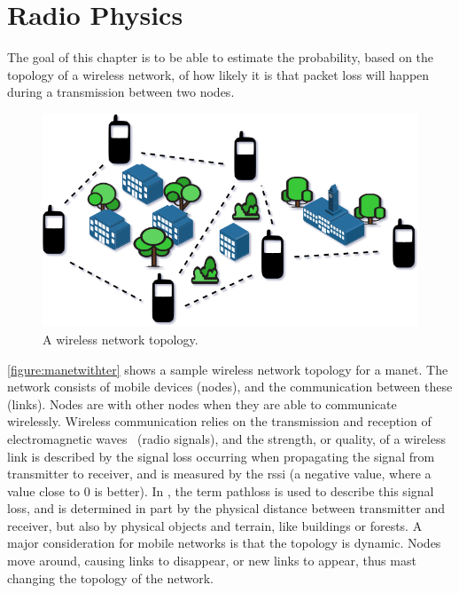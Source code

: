 \chapter{Radio Physics}\label{ch:radio-physics}
The goal of this chapter is to be able to estimate the probability, based on the topology of a wireless
network, of how likely it is that packet loss will happen during a transmission between two nodes.


\begin{figure}[ht]
    \centering
    \includegraphics[width=.7\textwidth]{figures/manet_with_terrain.png}
    \caption{A wireless network topology.}
    \label{figure:manetwithter}
\end{figure}

\autoref{figure:manetwithter} shows a sample wireless network topology for a \acrfull{manet}. The network
consists of mobile devices (nodes), and the communication between these (links). Nodes are
 with other nodes when they are able to communicate wirelessly. Wireless communication
relies on the transmission and reception of electromagnetic waves~\cite[p.~10]{paper:linkmodel} (radio
signals), and the strength, or quality, of a wireless link is described by the signal loss occurring when
propagating the signal from transmitter to receiver, and is measured by the \gls{rssi} (a negative value,
where a value close to 0 is better). In \cite{paper:linkmodel}, the term \gls{pathloss} is used to describe
this signal loss, and is determined in part by the physical distance between transmitter and receiver, but
also by physical objects and terrain, like buildings or forests. A major consideration for mobile networks is
that the topology is dynamic. Nodes move around, causing links to disappear, or new links to appear, thus mast
changing the topology of the network.






